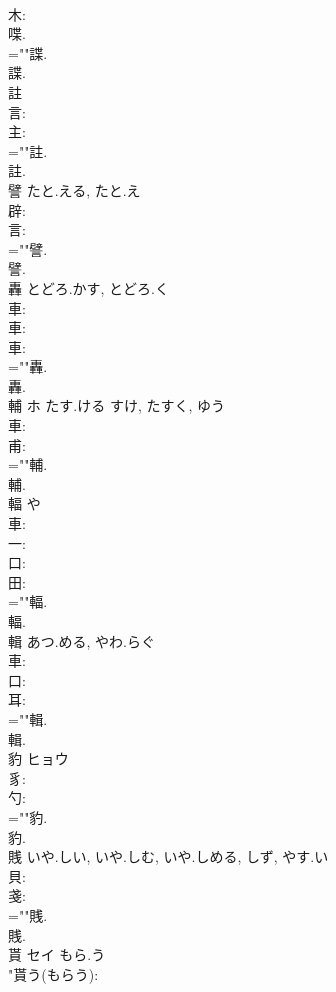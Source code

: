\documentclass[8pt]{extreport}
\begin{document}
\begin{CJK}{UTF8}{min}
\\	木: 
\\	喋. 
\\	=""諜.
\\	諜.
\\	註						
\\	言: 
\\	主: 
\\	=""註.
\\	註.
\\	譬		たと.える, たと.え				
\\	辟: 
\\	言: 
\\	=""譬.
\\	譬.
\\	轟		とどろ.かす, とどろ.く				
\\	車: 
\\	車: 
\\	車: 
\\	=""轟.
\\	轟.
\\	輔	ホ	たす.ける	すけ, たすく, ゆう	
\\	車: 
\\	甫: 
\\	=""輔.
\\	輔.
\\	輻		や				
\\	車: 
\\	一: 
\\	口: 
\\	田: 
\\	=""輻.
\\	輻.
\\	輯		あつ.める, やわ.らぐ				
\\	車: 
\\	口: 
\\	耳: 
\\	=""輯.
\\	輯.
\\	豹	ヒョウ			
\\	豸: 
\\	勺: 
\\	=""豹.
\\	豹.
\\	賎		いや.しい, いや.しむ, いや.しめる, しず, やす.い				
\\	貝: 
\\	戔: 
\\	=""賎.
\\	賎.
\\	貰	セイ	もら.う		
\\	"貰う(もらう): 

\end{CJK}
\end{document}
